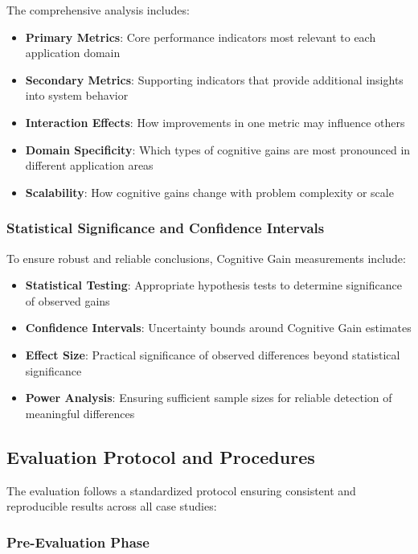The comprehensive analysis includes:

\begin{itemize}
\item \textbf{Primary Metrics}: Core performance indicators most relevant to each application domain
\item \textbf{Secondary Metrics}: Supporting indicators that provide additional insights into system behavior
\item \textbf{Interaction Effects}: How improvements in one metric may influence others
\item \textbf{Domain Specificity}: Which types of cognitive gains are most pronounced in different application areas
\item \textbf{Scalability}: How cognitive gains change with problem complexity or scale
\end{itemize}

\subsubsection{Statistical Significance and Confidence Intervals}

To ensure robust and reliable conclusions, Cognitive Gain measurements include:

\begin{itemize}
\item \textbf{Statistical Testing}: Appropriate hypothesis tests to determine significance of observed gains
\item \textbf{Confidence Intervals}: Uncertainty bounds around Cognitive Gain estimates
\item \textbf{Effect Size}: Practical significance of observed differences beyond statistical significance
\item \textbf{Power Analysis}: Ensuring sufficient sample sizes for reliable detection of meaningful differences
\end{itemize}

\subsection{Evaluation Protocol and Procedures}

The evaluation follows a standardized protocol ensuring consistent and reproducible results across all case studies:

\subsubsection{Pre-Evaluation Phase}


